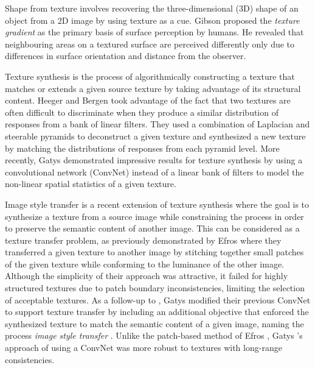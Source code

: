 Shape from texture involves recovering the
three-dimensional (3D) shape of an object from a 2D image by using texture as a 
cue. Gibson \cite{gibson1950perception} proposed the \emph{texture gradient} as 
the primary basis of surface perception by humans. He revealed that neighbouring areas on a textured surface are perceived differently only due to differences
in surface orientation and distance from the observer.

Texture synthesis  is the process of algorithmically constructing a texture that
matches or extends a given source texture by taking advantage of its structural 
content. Heeger and Bergen \cite{heeger1995pyramid} took advantage of the fact 
that two textures are often difficult to discriminate when they produce a similar 
distribution of responses from a bank of linear filters. They used a combination 
of Laplacian and steerable pyramids to deconstruct a given texture and 
synthesized a new texture by matching the distributions of responses from each
pyramid level. More recently, Gatys \etal \cite{gatys2015} demonstrated 
impressive results for texture synthesis by using a convolutional network (ConvNet) instead of a linear 
bank of filters to model the non-linear spatial statistics of a given texture.

Image style transfer  is a recent extension of texture synthesis where the goal is to 
synthesize a texture from a source image while constraining the process in order 
to preserve the semantic content of another image. This can be considered as a 
texture transfer problem, as previously demonstrated by Efros \etal \cite{efros2001image} where they transferred a given texture to another image by stitching together small patches of the given texture while conforming to the luminance of the other image. Although the simplicity of their approach was attractive, it failed for highly structured textures due to patch boundary inconsistencies, limiting the selection of acceptable textures. 
As a follow-up to \cite{gatys2015}, Gatys \etal modified their previous ConvNet to support texture transfer by including an additional objective that enforced the synthesized texture to match the semantic content of a given image, naming the process \emph{image style transfer} \cite{gatys2016image}. Unlike the patch-based method of Efros \etal \cite{efros2001image}, Gatys \etal's \cite{gatys2016image} approach of using a ConvNet was more robust to textures with long-range consistencies.

